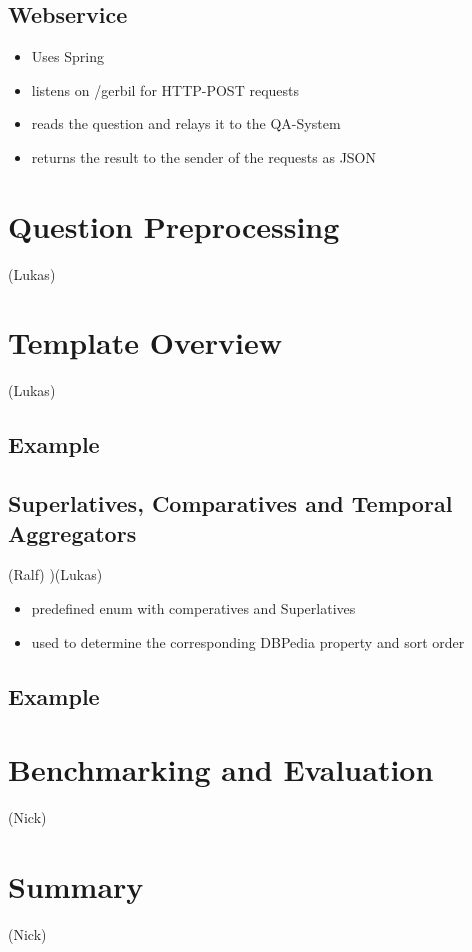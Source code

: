 \documentclass[runningheads]{llncs}
\begin{document}
\subsection{Webservice}

\begin{itemize}
	\item Uses Spring
	\item listens on /gerbil for HTTP-POST requests
	\item reads the question and relays it to the QA-System
	\item returns the result to the sender of the requests as JSON 
\end{itemize}

\section{Question Preprocessing} (Lukas)

\section{Template Overview} (Lukas)

\subsection{Example}

\subsection{Superlatives, Comparatives and Temporal Aggregators} (Ralf) )(Lukas)

\begin{itemize}
	\item predefined enum with comperatives and Superlatives
	\item used to determine the corresponding DBPedia property and sort order
\end{itemize}

\subsection{Example}

\section{Benchmarking and Evaluation} (Nick)

\section{Summary} (Nick)
\end{document}
